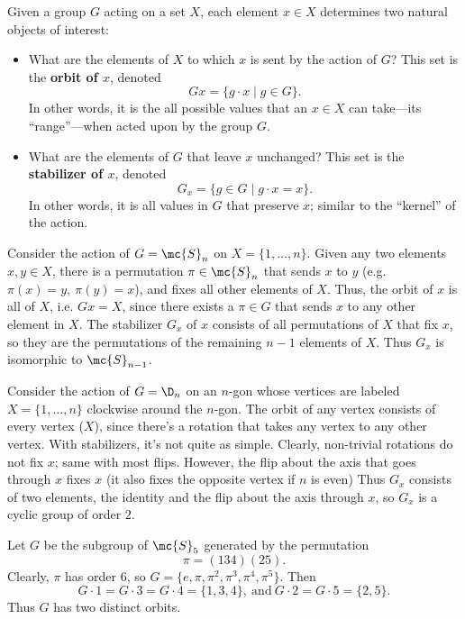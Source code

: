 \documentclass[math1530-lecture-notes]{subfiles}
\begin{document}
\begin{definition}{}
  Given a group $G$ acting on a set $X$, each element $x\in X$ determines two natural objects of
  interest:
  \begin{itemize}
    \item What are the elements of $X$ to which $x$ is sent by the action of $G$? This set is the
      \textbf{orbit of $x$}, denoted \[
        Gx=\{ g\cdot x\mid g\in G \}
      .\] In other words, it is the all possible values that an $x\in X$ can take---its
      ``range''---when acted upon by the group $G$.
    \item What are the elements of $G$ that leave $x$ unchanged? This set is the \textbf{stabilizer
      of $x$}, denoted \[
        G_x=\{g\in G\mid g\cdot x=x\} 
      .\] In other words, it is all values in $G$ that preserve $x$; similar to the ``kernel'' of
      the action.
  \end{itemize}
\end{definition}
\begin{example}
  Consider the action of $G=\mc{S}_n$ on $X=\{ 1,\ldots,n \}$. Given any two elements $x,y\in X$,
  there is a permutation $\pi\in \mc{S}_n$ that sends $x$ to $y$ (e.g. $\pi(x)=y,\ \pi(y)=x$), and
  fixes all other elements of $X$. Thus, the orbit of $x$ is all of $X$, i.e. $Gx=X$, since there
  exists a $\pi\in G$ that sends $x$ to any other element in $X$. The stabilizer $G_x$ of $x$
  consists of all permutations of $X$ that fix $x$, so they are the permutations of the remaining
  $n-1$ elements of $X$. Thus $G_x$ is isomorphic to $\mc{S}_{n-1}$.
\end{example}
\begin{example}
  Consider the action of $G=\D_n$ on an $n$-gon whose vertices are labeled $X=\{ 1,\ldots,n \}$
  clockwise around the $n$-gon. The orbit of any vertex consists of every vertex ($X$), since
  there's a rotation that takes any vertex to any other vertex. With stabilizers, it's not quite as
  simple. Clearly, non-trivial rotations do not fix $x$; same with most flips. However, the flip
  about the axis that goes through $x$ fixes $x$ (it also fixes the opposite vertex if $n$ is even)
  Thus $G_x$ consists of two elements, the identity and the flip about the axis through $x$, so
  $G_x$ is a cyclic group of order $2$.
\end{example}
\begin{example}
  Let $G$ be the subgroup of $\mc{S}_5$ generated by the permutation \[
    \pi=(134)(25)
  .\] Clearly, $\pi$ has order $6$, so $G=\{ e,\pi,\pi^2,\pi^3,\pi^4,\pi^5 \}$. Then \[
    G\cdot 1=G\cdot 3=G\cdot 4=\{ 1,3,4 \},~\text{and}~G\cdot 2=G\cdot 5=\{ 2,5 \}
  .\] Thus $G$ has two distinct orbits.
\end{example}
\end{document}
